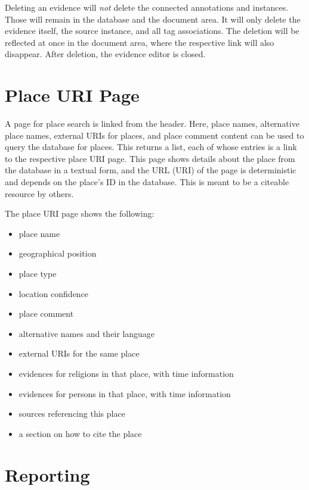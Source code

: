 Deleting an evidence will \emph{not} delete the connected annotations and instances.
Those will remain in the database and the document area.
It will only delete the evidence itself, the source instance, and all tag associations.
The deletion will be reflected at once in the document area, where the respective link will also disappear.
After deletion, the evidence editor is closed.


\section{Place URI Page}
\label{sec:place-uri-page}

A page for place search is linked from the header.
Here, place names, alternative place names, external URIs for places, and place comment content can be used to query the database for places.
This returns a list, each of whose entries is a link to the respective place URI page.
This page shows details about the place from the database in a textual form, and the URL (URI) of the page is deterministic and depends on the place's ID in the database.
This is meant to be a citeable resource by others.

The place URI page shows the following:

\begin{itemize}
  \item place name
  \item geographical position
  \item place type
  \item location confidence
  \item place comment
  \item alternative names and their language
  \item external URIs for the same place
  \item evidences for religions in that place, with time information
  \item evidences for persons in that place, with time information
  \item sources referencing this place
  \item a section on how to cite the place
\end{itemize}


\section{Reporting}
\label{sec:reporting}

